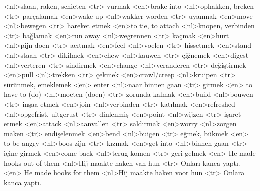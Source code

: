 <nl>slaan, raken, schieten
<tr> vurmak
<en>brake into 
<nl>ophakken, breken
<tr> parçalamak
<en>wake up 
<nl>wakker worden
<tr> uyanmak
<en>move 
<nl>bewegen
<tr> hareket etmek
<en>to tie, to attach 
<nl>knopen, verbinden
<tr> bağlamak
<en>run away 
<nl>wegrennen
<tr> kaçmak
<en>hurt 
<nl>pijn doen
<tr> acıtmak
<en>feel 
<nl>voelen
<tr> hissetmek
<en>stand 
<nl>staan
<tr> dikilmek
<en>chew 
<nl>kauwen
<tr> çiğnemek
<en>digest 
<nl>verteren
<tr> sindirmek
<en>change 
<nl>veranderen
<tr> değiştirmek
<en>pull 
<nl>trekken
<tr> çekmek
<en>crawl/creep 
<nl>kruipen
<tr> sürünmek, emeklemek
<en> enter 
<nl>naar binnen gaan 
<tr> girmek 
<en> to have to (do) 
<nl>moeten (doen) 
<tr> zorunda kalmak
<en>build 
<nl>bouwen
<tr> inşaa etmek
<en>join 
<nl>verbinden
<tr> katılmak
<en>refreshed 
<nl>opgefrist, uitgerust
<tr> dinlenmiş
<en>point 
<nl>wijzen
<tr> işaret etmek
<en>attack 
<nl>aanvallen
<tr> saldırmak
<en>worry 
<nl>zorgen maken
<tr> endişelenmek
<en>bend 
<nl>buigen
<tr> eğmek, bükmek
<en> to be angry 
<nl>boos zijn
<tr> kızmak
<en>get into 
<nl>binnen gaan
<tr> içine girmek
<en>come back 
<nl>terug komen
<tr> geri gelmek
<en> He made hooks out of them 
<nl>Hij maakte haken van hun 
<tr> Onları kanca yaptı.
<en> He made hooks for them 
<nl>Hij maakte haken voor hun 
<tr> Onlara kanca yaptı.
